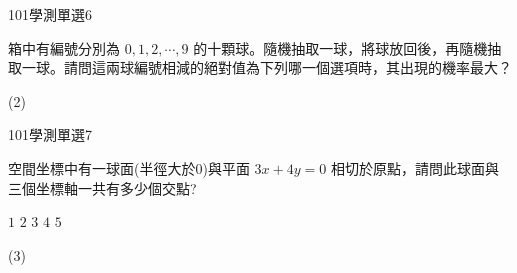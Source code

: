 \begin{QUESTIONS}
\begin{QUESTION}
\begin{ExamInfo}{101}{學測}{單選}{6}
        \end{ExamInfo}
        \begin{ExamAnsRateInfo}{66}{84}{71}{43}
        \end{ExamAnsRateInfo}
        \begin{QBODY}
			箱中有編號分別為 $0,1, 2, \cdots ,9$   的十顆球。隨機抽取一球，將球放回後，再隨機抽取一球。請問這兩球編號相減的絕對值為下列哪一個選項時，其出現的機率最大？
			\begin{QOPS}
			\end{QOPS}
        \end{QBODY}
        \begin{QFROMS}
        \end{QFROMS}
        \begin{QTAGS}\end{QTAGS}
        \begin{QANS}
            (2)
        \end{QANS}
        \begin{QSOLLIST}
        \end{QSOLLIST}
        \begin{QEMPTYSPACE}
        \end{QEMPTYSPACE}
    \end{QUESTION}
    \begin{QUESTION}
        \begin{ExamInfo}{101}{學測}{單選}{7}
        \end{ExamInfo}
        \begin{ExamAnsRateInfo}{37}{45}{34}{32}
        \end{ExamAnsRateInfo}
        \begin{QBODY}
			空間坐標中有一球面(半徑大於0)與平面 $3x+4y=0$ 相切於原點，請問此球面與三個坐標軸一共有多少個交點? 
			\begin{QOPS} 
				\QOP $1$ 
				\QOP $2$ 
				\QOP $3$ 
				\QOP $4$ 
				\QOP $5$
			\end{QOPS}
        \end{QBODY}
        \begin{QFROMS}
        \end{QFROMS}
        \begin{QTAGS}\end{QTAGS}
        \begin{QANS}
            (3)
        \end{QANS}
        \begin{QSOLLIST}
        \end{QSOLLIST}
        \begin{QEMPTYSPACE}
        \end{QEMPTYSPACE}
    \end{QUESTION}
\end{QUESTIONS}
